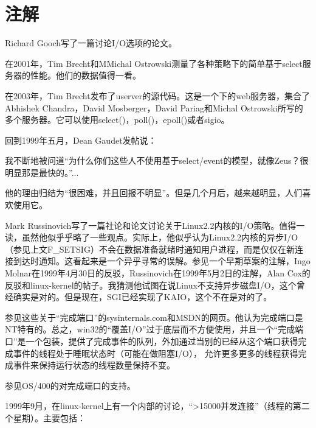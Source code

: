 \documentclass[12pt, twoside, a4paper, xetex]{report}
\begin{document}
\section*{注解}
	Richard Gooch写了一篇讨论I/O选项的论文。
	
	在2001年，Tim Brecht和MMichal Ostrowski测量了各种策略下的简单基于select服务器的性能。他们的数据值得一看。

	在2003年，Tim Brecht发布了userver的源代码。这是一个下的web服务器，集合了Abhishek Chandra，David Mosberger，David Pariag和Michal Ostrowski所写的多个服务器。它可以使用select()，poll()，epoll()或者sigio。

	回到1999年五月，Dean Gaudet发帖说：

	我不断地被问道“为什么你们这些人不使用基于select/event的模型，就像Zeus？很明显那是最快的。”...

	他的理由归结为“很困难，并且回报不明显”。但是几个月后，越来越明显，人们喜欢使用它。

	Mark Russinovich写了一篇社论和论文讨论关于Linux2.2内核的I/O策略。值得一读，虽然他似乎乎略了一些观点。实际上，他似乎认为Linux2.2内核的异步I/O（参见上文F\_SETSIG）不会在数据准备就绪时通知用户进程，而是仅仅在新连接到达时通知。这看起来是一个异乎寻常的误解。参见一个早期草案的注解，Ingo Molnar在1999年4月30日的反驳，Russinovich在1999年5月2日的注解，Alan Cox的反驳和linux-kernel的帖子。我猜测他试图在说Linux不支持异步磁盘I/O，这个曾经确实是对的。但是现在，SGI已经实现了KAIO，这个不在是对的了。

	参见这些关于“完成端口”的sysinternals.com和MSDN的网页。他认为完成端口是NT特有的。总之，win32的“覆盖I/O”过于底层而不方便使用，并且一个“完成端口”是一个包装，提供了完成事件的队列，外加通过当别的已经从这个端口获得完成事件的线程处于睡眠状态时（可能在做阻塞I/O）， 允许更多更多的线程获得完成事件来保持运行状态的线程数量保持不变。
	
	参见OS/400的对完成端口的支持。

	1999年9月，在linux-kernel上有一个内部的讨论，“>15000并发连接”（线程的第二个星期）。主要包括：
\end{document}
